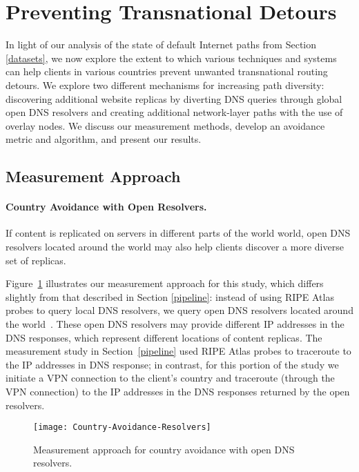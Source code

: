 \section{Preventing Transnational Detours}
\label{avoid_results}

In light of our analysis of the state of default Internet paths from
Section \ref{datasets}, we now explore the extent to which various
techniques and systems can help clients in various countries prevent
unwanted transnational routing detours. We explore two different
mechanisms for increasing path diversity: discovering additional website
replicas by diverting DNS queries through global open DNS resolvers and
creating additional network-layer paths with the use of overlay nodes.
We discuss our measurement methods, develop an avoidance metric and
algorithm, and present our results.

\subsection{Measurement Approach}
\label{avoid_pipelines}

\paragraph{Country Avoidance with Open Resolvers.} If content is
replicated on servers in different parts of the world world, open DNS
resolvers located 
around the world may also help clients discover a more diverse set of
replicas.  

Figure~\ref{fig:avoidance_resolvers} illustrates our measurement
approach for this study, which differs slightly from that described in
Section \ref{pipeline}: instead of using RIPE Atlas probes to query
local DNS resolvers, we query open DNS resolvers located around the
world~\cite{open_resolver_list}.  These open DNS resolvers may provide
different IP addresses in the DNS responses, which represent different
locations of content replicas. The measurement study in
Section~\ref{pipeline} used RIPE Atlas probes to traceroute to the IP
addresses in DNS response; in contrast, for this portion of the study we
initiate a VPN connection to the client's country and traceroute
(through the VPN connection) to the IP addresses in the DNS responses
returned by the open resolvers.

\begin{figure}[t]
\centering
\texttt{[image: Country-Avoidance-Resolvers]}
\caption{Measurement approach for country avoidance with open DNS resolvers.}
\label{fig:avoidance_resolvers}
\end{figure}

